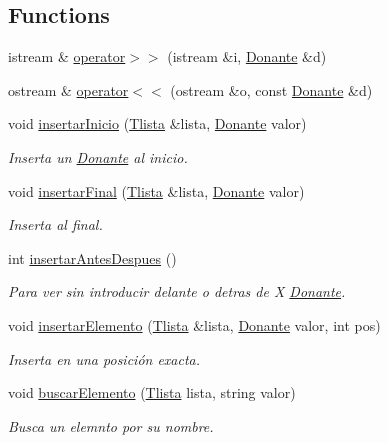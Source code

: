 \subsection*{Functions}
\begin{DoxyCompactItemize}
\item 
istream \& \hyperlink{namespaceed_aaf8c6865efded7cc4c17190655e2678f}{operator$>$$>$} (istream \&i, \hyperlink{classed_1_1Donante}{Donante} \&d)
\item 
ostream \& \hyperlink{namespaceed_aafbee410537c67960ecd31eb2529fab7}{operator$<$$<$} (ostream \&o, const \hyperlink{classed_1_1Donante}{Donante} \&d)
\item 
void \hyperlink{namespaceed_aaab35db2b702b1205f6a432d73877757}{insertar\+Inicio} (\hyperlink{structed_1_1nodo}{Tlista} \&lista, \hyperlink{classed_1_1Donante}{Donante} valor)
\begin{DoxyCompactList}\small\item\em Inserta un \hyperlink{classed_1_1Donante}{Donante} al inicio. \end{DoxyCompactList}\item 
void \hyperlink{namespaceed_a428d4888edcfccfb7a29f1158ca7a202}{insertar\+Final} (\hyperlink{structed_1_1nodo}{Tlista} \&lista, \hyperlink{classed_1_1Donante}{Donante} valor)
\begin{DoxyCompactList}\small\item\em Inserta al final. \end{DoxyCompactList}\item 
int \hyperlink{namespaceed_af095e3a306a84ee959dd9b4c40a1c3e4}{insertar\+Antes\+Despues} ()
\begin{DoxyCompactList}\small\item\em Para ver sin introducir delante o detras de X \hyperlink{classed_1_1Donante}{Donante}. \end{DoxyCompactList}\item 
void \hyperlink{namespaceed_aa63c9b895fad0470305bc5c4a9671ddb}{insertar\+Elemento} (\hyperlink{structed_1_1nodo}{Tlista} \&lista, \hyperlink{classed_1_1Donante}{Donante} valor, int pos)
\begin{DoxyCompactList}\small\item\em Inserta en una posición exacta. \end{DoxyCompactList}\item 
void \hyperlink{namespaceed_a366da3a75bd476b2115e21af04cd1c88}{buscar\+Elemento} (\hyperlink{structed_1_1nodo}{Tlista} lista, string valor)
\begin{DoxyCompactList}\small\item\em Busca un elemnto por su nombre. \end{DoxyCompactList}\item 

\end{DoxyCompactItemize}
